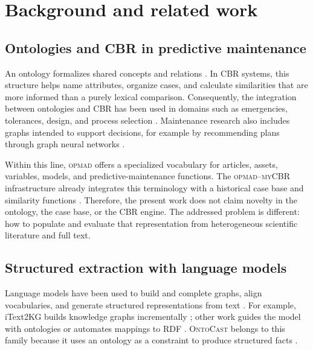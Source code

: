 \documentclass[journal]{IEEEtran}
\newcommand{\OPMAD}{\textsc{opmad}}
\newcommand{\OntoCast}{\textsc{OntoCast}}
\newcommand{\myCBR}{\textsc{myCBR}}
\begin{document}
\section{Background and related work}
\label{sec:related}

\subsection{Ontologies and CBR in predictive maintenance}

An ontology formalizes shared concepts and relations \cite{Gruber1993Ontology,NoyMcGuinness2001Ontology101}. In CBR systems, this structure helps name attributes, organize cases, and calculate similarities that are more informed than a purely lexical comparison. Consequently, the integration between ontologies and CBR has been used in domains such as emergencies, tolerances, design, and process selection \cite{AmailefLu2013OntologyCBR,Qin2018OntologyCBR,RomeroBejarano2014CBRDesign,Mabkhot2019OntologyCBR}. Maintenance research also includes graphs intended to support decisions, for example by recommending plans through graph neural networks \cite{Xia2023MaintenanceKG}.

Within this line, \OPMAD{} offers a specialized vocabulary for articles, assets, variables, models, and predictive-maintenance functions. The \OPMAD{}--\myCBR{} infrastructure already integrates this terminology with a historical case base and similarity functions \cite{MonteroJimenez2021OPMADCBR,MunozHernandez2021OntologyCBR}. Therefore, the present work does not claim novelty in the ontology, the case base, or the CBR engine. The addressed problem is different: how to populate and evaluate that representation from heterogeneous scientific literature and full text.

\subsection{Structured extraction with language models}

Language models have been used to build and complete graphs, align vocabularies, and generate structured representations from text \cite{Pan2024LLMKG}. For example, iText2KG builds knowledge graphs incrementally \cite{Lairgi2024IText2KG}; other work guides the model with ontologies or automates mappings to RDF \cite{Mustafa2025OntologyGuided,Marketakis2026RDFMappings}. \OntoCast{} belongs to this family because it uses an ontology as a constraint to produce structured facts \cite{Belikov2025OntoCast}.
\end{document}
